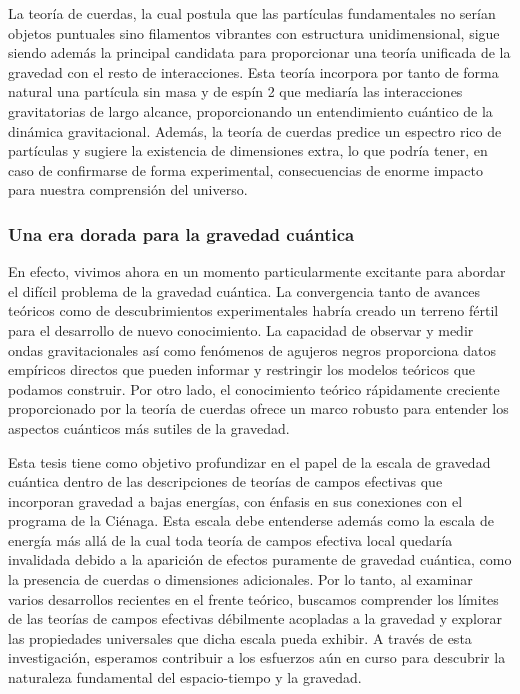 La teoría de cuerdas, la cual postula que las partículas fundamentales no serían objetos puntuales sino filamentos vibrantes con estructura unidimensional, sigue siendo además la principal candidata para proporcionar una teoría unificada de la gravedad con el resto de interacciones. Esta teoría incorpora por tanto de forma natural una partícula sin masa y de espín 2 que mediaría las interacciones gravitatorias de largo alcance, proporcionando un entendimiento cuántico de la dinámica gravitacional. Además, la teoría de cuerdas predice un espectro rico de partículas y sugiere la existencia de dimensiones extra, lo que podría tener, en caso de confirmarse de forma experimental, consecuencias de enorme impacto para nuestra comprensión del universo.

\subsubsection*{Una era dorada para la gravedad cuántica}

En efecto, vivimos ahora en un momento particularmente excitante para abordar el difícil problema de la gravedad cuántica. La convergencia tanto de avances teóricos como de descubrimientos experimentales habría creado un terreno fértil para el desarrollo de nuevo conocimiento. La capacidad de observar y medir ondas gravitacionales así como fenómenos de agujeros negros proporciona datos empíricos directos que pueden informar y restringir los modelos teóricos que podamos construir. Por otro lado, el conocimiento teórico rápidamente creciente proporcionado por la teoría de cuerdas ofrece un marco robusto para entender los aspectos cuánticos más sutiles de la gravedad.

Esta tesis tiene como objetivo profundizar en el papel de la escala de gravedad cuántica dentro de las descripciones de teorías de campos efectivas que incorporan gravedad a bajas energías, con énfasis en sus conexiones con el programa de la Ciénaga. Esta escala debe entenderse además como la escala de energía más allá de la cual toda teoría de campos efectiva local quedaría invalidada debido a la aparición de efectos puramente de gravedad cuántica, como la presencia de cuerdas o dimensiones adicionales. Por lo tanto, al examinar varios desarrollos recientes en el frente teórico, buscamos comprender los límites de las teorías de campos efectivas débilmente acopladas a la gravedad y explorar las propiedades universales que dicha escala pueda exhibir. A través de esta investigación, esperamos contribuir a los esfuerzos aún en curso para descubrir la naturaleza fundamental del espacio-tiempo y la gravedad.

